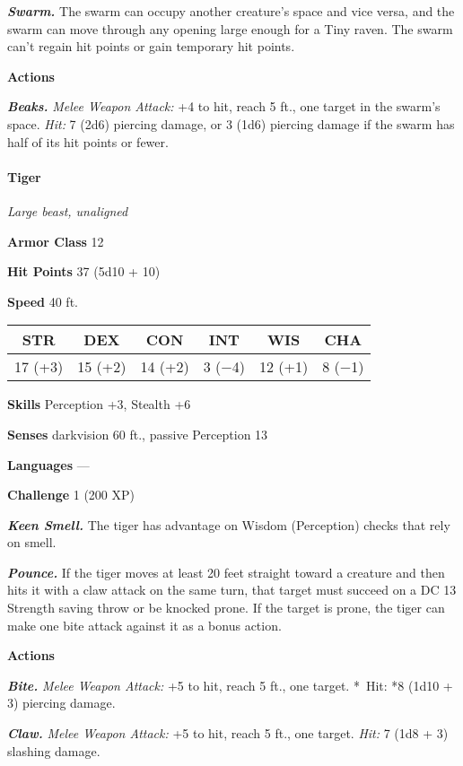 \documentclass[
]{article}
\begin{document}
\emph{\textbf{Swarm.}} The swarm can occupy another creature's space and
vice versa, and the swarm can move through any opening large enough for
a Tiny raven. The swarm can't regain hit points or gain temporary hit
points.

\textbf{Actions}

\emph{\textbf{Beaks.}} \emph{Melee Weapon Attack:} +4 to hit, reach 5
ft., one target in the swarm's space. \emph{Hit:} 7 (2d6) piercing
damage, or 3 (1d6) piercing damage if the swarm has half of its hit
points or fewer.

\hypertarget{tiger}{%
\paragraph{Tiger}\label{tiger}}

\emph{Large beast, unaligned}

\textbf{Armor Class} 12

\textbf{Hit Points} 37 (5d10 + 10)

\textbf{Speed} 40 ft.

\begin{longtable}[]{@{}cccccc@{}}
\toprule
STR & DEX & CON & INT & WIS & CHA\tabularnewline
\midrule
\endhead
17 (+3) & 15 (+2) & 14 (+2) & 3 (−4) & 12 (+1) & 8 (−1)\tabularnewline
\bottomrule
\end{longtable}

\textbf{Skills} Perception +3, Stealth +6

\textbf{Senses} darkvision 60 ft., passive Perception 13

\textbf{Languages} ---

\textbf{Challenge} 1 (200 XP)

\emph{\textbf{Keen Smell.}} The tiger has advantage on Wisdom
(Perception) checks that rely on smell.

\emph{\textbf{Pounce.}} If the tiger moves at least 20 feet straight
toward a creature and then hits it with a claw attack on the same turn,
that target must succeed on a DC 13 Strength saving throw or be knocked
prone. If the target is prone, the tiger can make one bite attack
against it as a bonus action.

\textbf{Actions}

\emph{\textbf{Bite.}} \emph{Melee Weapon Attack:} +5 to hit, reach 5
ft., one target. *~Hit: *8 (1d10 + 3) piercing damage.

\emph{\textbf{Claw.}} \emph{Melee Weapon Attack:} +5 to hit, reach 5
ft., one target. \emph{Hit:} 7 (1d8 + 3) slashing damage.
\end{document}
